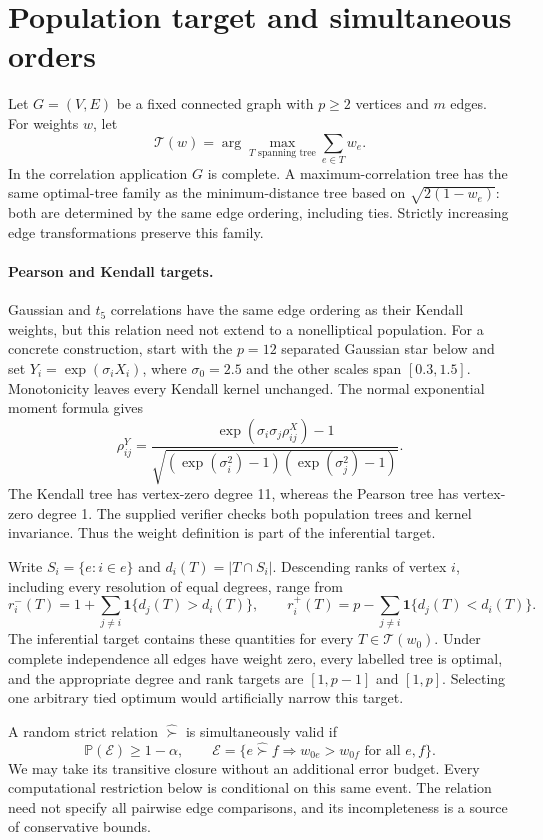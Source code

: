 \documentclass[11pt]{article}
\theoremstyle{plain}
\theoremstyle{definition}\newtheorem{remark}{Remark}\newtheorem{example}{Example}
\newcommand{\T}{\mathcal T}\newcommand{\Pp}{\mathbb P}\newcommand{\E}{\mathbb E}\newcommand{\ind}{\mathbf1}
\begin{document}
\section{Population target and simultaneous orders}
Let $G=(V,E)$ be a fixed connected graph with $p\ge2$ vertices and $m$ edges. For weights $w$, let
\[
 \T(w)=\arg\max_{T\text{ spanning tree}}\sum_{e\in T}w_e.
\]
In the correlation application $G$ is complete. A maximum-correlation tree has the same optimal-tree family as the minimum-distance tree based on $\sqrt{2(1-w_e)}$: both are determined by the same edge ordering, including ties. Strictly increasing edge transformations preserve this family.

\paragraph{Pearson and Kendall targets.}
Gaussian and $t_5$ correlations have the same edge ordering as their Kendall weights, but this relation need not extend to a nonelliptical population. For a concrete construction, start with the $p=12$ separated Gaussian star below and set $Y_i=\exp(\sigma_i X_i)$, where $\sigma_0=2.5$ and the other scales span $[0.3,1.5]$. Monotonicity leaves every Kendall kernel unchanged. The normal exponential moment formula gives
\[
 \rho^{Y}_{ij}=\frac{\exp(\sigma_i\sigma_j\rho^X_{ij})-1}{\sqrt{(\exp(\sigma_i^2)-1)(\exp(\sigma_j^2)-1)}}.
\]
The Kendall tree has vertex-zero degree 11, whereas the Pearson tree has vertex-zero degree 1. The supplied verifier checks both population trees and kernel invariance. Thus the weight definition is part of the inferential target.

Write $S_i=\{e:i\in e\}$ and $d_i(T)=|T\cap S_i|$. Descending ranks of vertex $i$, including every resolution of equal degrees, range from
\begin{equation}\label{eq:ranks}
 r_i^-(T)=1+\sum_{j\ne i}\ind\{d_j(T)>d_i(T)\},\qquad
 r_i^+(T)=p-\sum_{j\ne i}\ind\{d_j(T)<d_i(T)\}.
\end{equation}
The inferential target contains these quantities for every $T\in\T(w_0)$. Under complete independence all edges have weight zero, every labelled tree is optimal, and the appropriate degree and rank targets are $[1,p-1]$ and $[1,p]$. Selecting one arbitrary tied optimum would artificially narrow this target.

A random strict relation $\widehat{\succ}$ is simultaneously valid if
\begin{equation}\label{eq:event}
 \Pp(\mathcal E)\ge1-\alpha,\qquad
 \mathcal E=\{e\widehat{\succ}f\Longrightarrow w_{0e}>w_{0f}\text{ for all }e,f\}.
\end{equation}
We may take its transitive closure without an additional error budget. Every computational restriction below is conditional on this same event. The relation need not specify all pairwise edge comparisons, and its incompleteness is a source of conservative bounds.
\end{document}
